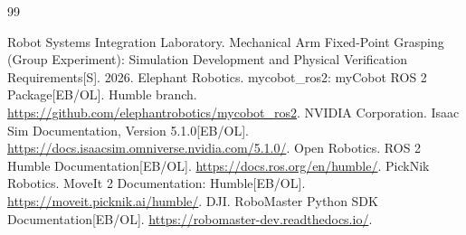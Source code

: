 \documentclass[UTF8,zihao=-4,scheme=chinese,fontset=none]{ctexart}
\begin{document}
\clearpage\begingroup\sloppy
\begin{thebibliography}{99}
 Robot Systems Integration Laboratory. Mechanical Arm Fixed-Point Grasping (Group Experiment): Simulation Development and Physical Verification Requirements[S]. 2026.
 Elephant Robotics. mycobot\_ros2: myCobot ROS 2 Package[EB/OL]. Humble branch. \url{https://github.com/elephantrobotics/mycobot_ros2}.
 NVIDIA Corporation. Isaac Sim Documentation, Version 5.1.0[EB/OL]. \url{https://docs.isaacsim.omniverse.nvidia.com/5.1.0/}.
 Open Robotics. ROS 2 Humble Documentation[EB/OL]. \url{https://docs.ros.org/en/humble/}.
 PickNik Robotics. MoveIt 2 Documentation: Humble[EB/OL]. \url{https://moveit.picknik.ai/humble/}.
 DJI. RoboMaster Python SDK Documentation[EB/OL]. \url{https://robomaster-dev.readthedocs.io/}.
\end{thebibliography}\endgroup
\end{document}
